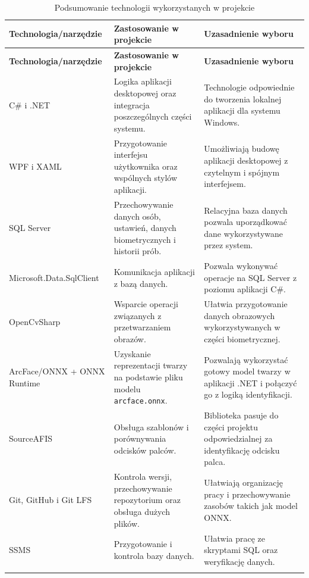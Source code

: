 \setlength{\tabcolsep}{4pt}
\renewcommand{\arraystretch}{1.15}
\begin{xltabular}{\textwidth}{|
    >{\RaggedRight\arraybackslash}p{3.5cm}|
    >{\RaggedRight\arraybackslash}X|
    >{\RaggedRight\arraybackslash}X|}

    \hline
    \textbf{Technologia/narzędzie} & \textbf{Zastosowanie w projekcie} & \textbf{Uzasadnienie wyboru} \\
    \hline
    \endfirsthead

    \hline
    \textbf{Technologia/narzędzie} & \textbf{Zastosowanie w projekcie} & \textbf{Uzasadnienie wyboru} \\
    \hline
    \endhead

    C\# i .NET & Logika aplikacji desktopowej oraz integracja poszczególnych części systemu. & Technologie odpowiednie do tworzenia lokalnej aplikacji dla systemu Windows. \\
    \hline
    WPF i XAML & Przygotowanie interfejsu użytkownika oraz wspólnych stylów aplikacji. & Umożliwiają budowę aplikacji desktopowej z czytelnym i spójnym interfejsem. \\
    \hline
    SQL Server & Przechowywanie danych osób, ustawień, danych biometrycznych i historii prób. & Relacyjna baza danych pozwala uporządkować dane wykorzystywane przez system. \\
    \hline
    Microsoft.Data.SqlClient & Komunikacja aplikacji z bazą danych. & Pozwala wykonywać operacje na SQL Server z poziomu aplikacji C\#. \\
    \hline
    OpenCvSharp & Wsparcie operacji związanych z przetwarzaniem obrazów. & Ułatwia przygotowanie danych obrazowych wykorzystywanych w części biometrycznej. \\
    \hline
    ArcFace/ONNX + ONNX Runtime & Uzyskanie reprezentacji twarzy na podstawie pliku modelu \texttt{arcface.onnx}. & Pozwalają wykorzystać gotowy model twarzy w aplikacji .NET i połączyć go z logiką identyfikacji. \\
    \hline
    SourceAFIS & Obsługa szablonów i porównywania odcisków palców. & Biblioteka pasuje do części projektu odpowiedzialnej za identyfikację odcisku palca. \\
    \hline
    Git, GitHub i Git LFS & Kontrola wersji, przechowywanie repozytorium oraz obsługa dużych plików. & Ułatwiają organizację pracy i przechowywanie zasobów takich jak model ONNX. \\
    \hline
    SSMS & Przygotowanie i kontrola bazy danych. & Ułatwia pracę ze skryptami SQL oraz weryfikację danych. \\
    \hline

    \caption{Podsumowanie technologii wykorzystanych w projekcie}
    \label{tab:technologie-podsumowanie}
\end{xltabular}

\setlength{\tabcolsep}{6pt}